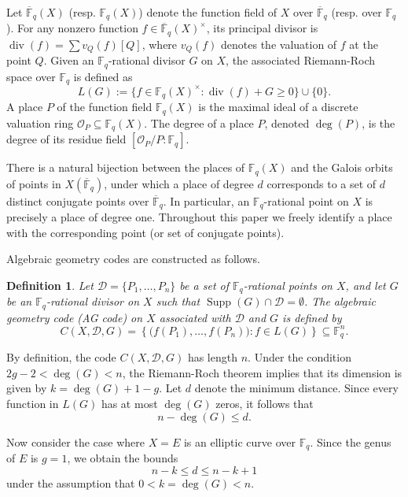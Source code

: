 \documentclass[journal,12pt,onecolumn]{IEEEtran}
\newtheorem{definition}[theorem]{Definition}
\begin{document}
Let $\overline{\mathbb{F}}_q(X)$ (resp. $\mathbb{F}_q(X)$) denote the function field of $X$ over $\overline{\mathbb{F}}_q$ (resp. over $\mathbb{F}_q$). For any nonzero function $f \in \overline{\mathbb{F}}_q(X)^{\times}$, its principal divisor is $\operatorname{div}(f) = \sum v_Q(f)[Q]$, where $v_Q(f)$ denotes the valuation of $f$ at the point $Q$. Given an $\mathbb{F}_q$-rational divisor $G$ on $X$, the associated Riemann-Roch space over $\mathbb{F}_q$ is defined as
\[
L(G) := \{ f \in \mathbb{F}_q(X)^{\times} : \operatorname{div}(f) + G \ge 0 \} \cup \{0\}.
\]
A place $P$ of the function field $\mathbb{F}_q(X)$ is the maximal ideal of a discrete valuation ring $\mathcal{O}_P \subseteq \mathbb{F}_q(X)$. The degree of a place $P$, denoted $\deg(P)$, is the degree of its residue field $[\mathcal{O}_P/P : \mathbb{F}_q]$.

There is a natural bijection between the places of $\mathbb{F}_q(X)$ and the Galois orbits of points in $X(\overline{\mathbb{F}}_q)$, under which a place of degree $d$ corresponds to a set of $d$ distinct conjugate points over $\overline{\mathbb{F}}_q$. In particular, an $\mathbb{F}_q$-rational point on $X$ is precisely a place of degree one. Throughout this paper we freely identify a place with the corresponding point (or set of conjugate points). 


Algebraic geometry codes are constructed as follows.

\begin{definition}\label{def:definition_of_AG_codes}
Let $\mathcal{D} = \{P_1, \ldots, P_n\}$ be a set of $\mathbb{F}_q$-rational points on $X$, and let $G$ be an $\mathbb{F}_q$-rational divisor on $X$ such that $\operatorname{Supp}(G) \cap \mathcal{D} = \emptyset$. The algebraic geometry code (AG code) on $X$ associated with $\mathcal{D}$ and $G$ is defined by
\[
C(X, \mathcal{D}, G) = \left\{ \bigl( f(P_1), \ldots, f(P_n) \bigr) : f \in L(G) \right\} \subseteq \mathbb{F}_q^n.
\]
\end{definition}


By definition, the code $C(X, \mathcal{D}, G)$ has length $n$. Under the condition $2g - 2 < \deg(G) < n$, the Riemann-Roch theorem implies that its dimension is given by $k = \deg(G) + 1 - g$. Let $d$ denote the minimum distance. Since every function in $L(G)$ has at most $\deg(G)$ zeros, it follows that
\[
n - \deg(G) \le d.
\]

Now consider the case where $X = E$ is an elliptic curve over $\mathbb{F}_q$. Since the genus of $E $ is $g = 1$, we obtain the bounds
\[
n - k \le d \le n - k + 1
\]
under the assumption that $0 < k = \deg(G) < n$.
\end{document}
